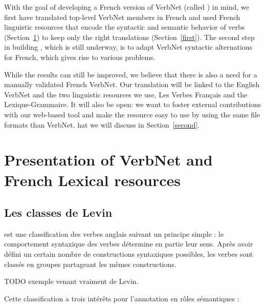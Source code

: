 With the goal of developing a French version of VerbNet (called \verbenet{}) in
mind, we first have translated top-level VerbNet members in French and used
French linguistic resources that encode the syntactic and semantic behavior of
verbs (Section~\ref{french}) to keep only the right translations
(Section~\ref{first}).
The second step in building \verbenet{}, which is still underway, is to adapt
VerbNet syntactic alternations for French, which gives rise to various
problems.

While the results can still be improved, we believe that there is also a need
for a manually validated French VerbNet.  Our translation will be linked to the
English VerbNet and the two linguistic resources we use, Les Verbes Français
and the Lexique-Grammaire. It will also be open: we want to foster external
contributions with our web-based tool and make the resource easy to use by
using the same file formats than VerbNet.  hat we will discuss in
Section~\ref{second}.

\section{Presentation of VerbNet and French Lexical resources}\label{french}

\subsection{Les classes de Levin}


\cite{levin1993english} est une classification des verbes anglais suivant un
principe simple : le comportement syntaxique des verbes détermine en partie
leur sens. Après avoir défini un certain nombre de constructions syntaxiques
possibles, les verbes sont classés en groupes partageant les mêmes
constructions.

TODO exemple venant vraiment de Levin.

Cette classification a trois intérêts pour l'annotation en rôles sémantiques :

